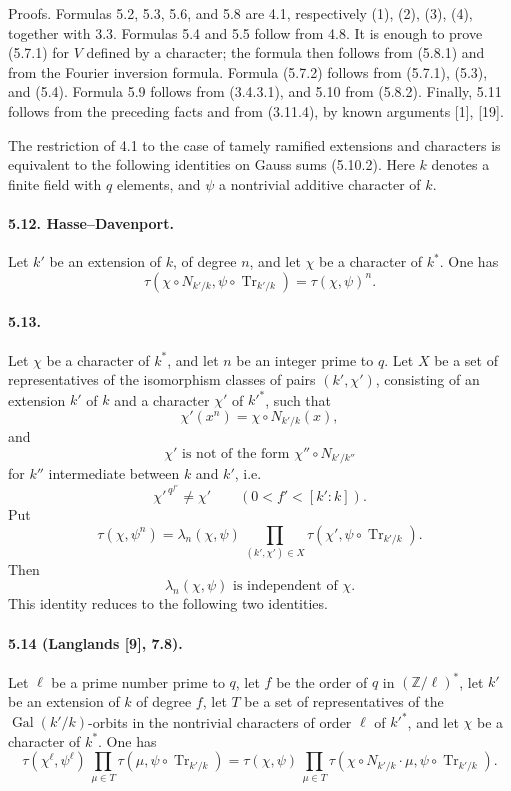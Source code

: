 \documentclass[10pt,letterpaper]{article}
\newcommand{\Gal}{\operatorname{Gal}}
\newcommand{\Tr}{\operatorname{Tr}}
\providecommand{\Gal}{\operatorname{Gal}}
\providecommand{\Gal}{\operatorname{Gal}}
\providecommand{\Tr}{\operatorname{Tr}}
\providecommand{\Gal}{\operatorname{Gal}}
\providecommand{\Tr}{\operatorname{Tr}}
\providecommand{\Gal}{\operatorname{Gal}}
\providecommand{\Tr}{\operatorname{Tr}}
\begin{document}
Proofs. Formulas 5.2, 5.3, 5.6, and 5.8 are 4.1, respectively (1), (2), (3), (4), together with 3.3. Formulas 5.4 and 5.5 follow from 4.8. It is enough to prove (5.7.1) for \(V\) defined by a character; the formula then follows from (5.8.1) and from the Fourier inversion formula. Formula (5.7.2) follows from (5.7.1), (5.3), and (5.4). Formula 5.9 follows from (3.4.3.1), and 5.10 from (5.8.2). Finally, 5.11 follows from the preceding facts and from (3.11.4), by known arguments [1], [19].

The restriction of 4.1 to the case of tamely ramified extensions and characters is equivalent to the following identities on Gauss sums (5.10.2). Here \(k\) denotes a finite field with \(q\) elements, and \(\psi\) a nontrivial additive character of \(k\).

\paragraph{5.12. Hasse--Davenport.} Let \(k'\) be an extension of \(k\), of degree \(n\), and let \(\chi\) be a character of \(k^*\). One has
\[
\tag{5.12.1}
\tau(\chi\circ N_{k'/k},\psi\circ\Tr_{k'/k})
=
\tau(\chi,\psi)^n.
\]

\paragraph{5.13.} Let \(\chi\) be a character of \(k^*\), and let \(n\) be an integer prime to \(q\). Let \(X\) be a set of representatives of the isomorphism classes of pairs \((k',\chi')\), consisting of an extension \(k'\) of \(k\) and a character \(\chi'\) of \(k'^*\), such that
\[
\tag{a}
\chi'(x^n)=\chi\circ N_{k'/k}(x),
\]
and
\[
\tag{b}
\chi'\text{ is not of the form }\chi''\circ N_{k'/k''}
\]
for \(k''\) intermediate between \(k\) and \(k'\), i.e.
\[
\chi'^{\,q^{f'}}\ne\chi'
\qquad(0<f'<[k':k]).
\]
Put
\[
\tau(\chi,\psi^n)=
\lambda_n(\chi,\psi)\,
\prod_{(k',\chi')\in X}
\tau(\chi',\psi\circ\Tr_{k'/k}).
\]
Then
\[
\tag{5.13.1}
\lambda_n(\chi,\psi)\text{ is independent of }\chi.
\]
This identity reduces to the following two identities.

\paragraph{5.14 (Langlands [9], 7.8).} Let \(\ell\) be a prime number prime to \(q\), let \(f\) be the order of \(q\) in \((\mathbb Z/\ell)^*\), let \(k'\) be an extension of \(k\) of degree \(f\), let \(T\) be a set of representatives of the \(\Gal(k'/k)\)-orbits in the nontrivial characters of order \(\ell\) of \(k'^*\), and let \(\chi\) be a character of \(k^*\). One has
\[
\tau(\chi^\ell,\psi^\ell)\,
\prod_{\mu\in T}\tau(\mu,\psi\circ\Tr_{k'/k})
=
\tau(\chi,\psi)\,
\prod_{\mu\in T}\tau(\chi\circ N_{k'/k}\cdot\mu,\psi\circ\Tr_{k'/k}).
\]
\end{document}
